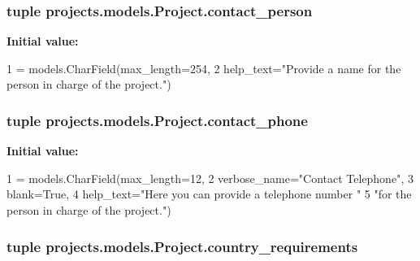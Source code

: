 \hypertarget{classprojects_1_1models_1_1_project_a5b80bb906ad5a041a2113b8bd70a2f7b}{
\subsubsection[{contact\-\_\-person}]{\setlength{\rightskip}{0pt plus 5cm}tuple projects.\-models.\-Project.\-contact\-\_\-person\hspace{0.3cm}{\ttfamily [static]}}}\label{classprojects_1_1models_1_1_project_a5b80bb906ad5a041a2113b8bd70a2f7b}
{\bfseries Initial value\-:}
\begin{DoxyCode}
1 = models.CharField(max\_length=254,
2                                       help\_text=\textcolor{stringliteral}{"Provide a name for the person in charge of the project."})
\end{DoxyCode}
\hypertarget{classprojects_1_1models_1_1_project_a4f9549b40bff6b64d1ee32524b3c6dfb}{
\subsubsection[{contact\-\_\-phone}]{\setlength{\rightskip}{0pt plus 5cm}tuple projects.\-models.\-Project.\-contact\-\_\-phone\hspace{0.3cm}{\ttfamily [static]}}}\label{classprojects_1_1models_1_1_project_a4f9549b40bff6b64d1ee32524b3c6dfb}
{\bfseries Initial value\-:}
\begin{DoxyCode}
1 = models.CharField(max\_length=12,
2                                      verbose\_name=\textcolor{stringliteral}{"Contact Telephone"},
3                                      blank=\textcolor{keyword}{True},
4                                      help\_text=\textcolor{stringliteral}{"Here you can provide a telephone number "}
5                                                \textcolor{stringliteral}{"for the person in charge of the project."})
\end{DoxyCode}
\hypertarget{classprojects_1_1models_1_1_project_abda371572f3a1c5045388a5ffba1e6b8}{
\subsubsection[{country\-\_\-requirements}]{\setlength{\rightskip}{0pt plus 5cm}tuple projects.\-models.\-Project.\-country\-\_\-requirements\hspace{0.3cm}{\ttfamily [static]}}}\label{classprojects_1_1models_1_1_project_abda371572f3a1c5045388a5ffba1e6b8}
